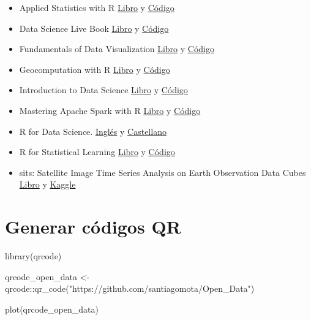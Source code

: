 \documentclass[
  letterpaper,
  DIV=11,
  numbers=noendperiod]{scrartcl}
\newenvironment{Shaded}{\begin{snugshade}}{\end{snugshade}}
\newcommand{\FunctionTok}[1]{\textcolor[rgb]{0.28,0.35,0.67}{#1}}
\newcommand{\NormalTok}[1]{\textcolor[rgb]{0.00,0.23,0.31}{#1}}
\newcommand{\OtherTok}[1]{\textcolor[rgb]{0.00,0.23,0.31}{#1}}
\newcommand{\SpecialCharTok}[1]{\textcolor[rgb]{0.37,0.37,0.37}{#1}}
\newcommand{\StringTok}[1]{\textcolor[rgb]{0.13,0.47,0.30}{#1}}
\begin{document}
\begin{itemize}
  \href{https://bookdown.org/ndphillips/YaRrr/}{YaRrr! The Pirate's
  Guide to R}
\item
  Applied Statistics with R
  \href{https://daviddalpiaz.github.io/appliedstats/}{Libro} y
  \href{https://github.com/daviddalpiaz/appliedstats}{Código}
\item
  Data Science Live Book
  \href{https://livebook.datascienceheroes.com/}{Libro} y
  \href{https://github.com/pablo14/data-science-live-book}{Código}
\item
  Fundamentals of Data Visualization
  \href{https://clauswilke.com/dataviz/}{Libro} y
  \href{https://github.com/clauswilke/dataviz}{Código}
\item
  Geocomputation with R
  \href{https://geocompr.robinlovelace.net/}{Libro} y
  \href{https://github.com/Robinlovelace/geocompr/}{Código}
\item
  Introduction to Data Science
  \href{https://rafalab.github.io/dsbook/}{Libro} y
  \href{https://github.com/rafalab/dsbook}{Código}
\item
  Mastering Apache Spark with R
  \href{https://therinspark.com/intro.html}{Libro} y
  \href{https://github.com/r-spark/the-r-in-spark}{Código}
\item
  R for Data Science. \href{https://r4ds.hadley.nz/}{Inglés} y
  \href{https://es.r4ds.hadley.nz/}{Castellano}
\item
  R for Statistical Learning
  \href{https://daviddalpiaz.github.io/r4sl/}{Libro} y
  \href{https://github.com/daviddalpiaz/r4sl}{Código}
\item
  sits: Satellite Image Time Series Analysis on Earth Observation Data
  Cubes \href{https://e-sensing.github.io/sitsbook/index.html}{Libro} y
  \href{https://www.kaggle.com/esensing/code}{Kaggle}
\end{itemize}

\section{Generar códigos QR}\label{generar-cuxf3digos-qr}

\begin{Shaded}
\begin{Highlighting}[]
\FunctionTok{library}\NormalTok{(qrcode)}

\NormalTok{qrcode\_open\_data }\OtherTok{\textless{}{-}}\NormalTok{ qrcode}\SpecialCharTok{::}\FunctionTok{qr\_code}\NormalTok{(}\StringTok{"https://github.com/santiagomota/Open\_Data"}\NormalTok{)}

\FunctionTok{plot}\NormalTok{(qrcode\_open\_data)}
\end{Highlighting}
\end{Shaded}
\end{document}

